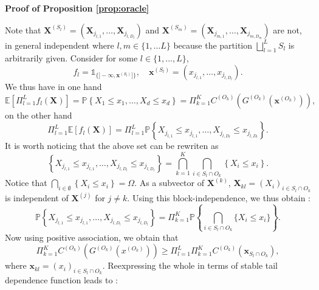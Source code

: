 \documentclass[11pt]{article}
\makeatletter
\theoremstyle{definition}
\renewenvironment{proof}[1][\proofname]{\par
\pushQED{\qed}%
\normalfont \topsep6\p@\@plus6\p@\relax
\trivlist
\item\relax
{\textbf{
#1\@addpunct{ }}}\hspace\labelsep\ignorespaces
}{%
\popQED\endtrivlist\@endpefalse
}
\makeatother
\begin{document}
	\begin{proof}[Proof of Proposition \ref{prop:oracle}]
		Note that $\textbf{X}^{(S_l)} = (\textbf{X}_{j_{l,1}}, \dots, \textbf{X}_{j_{l,D_l}})$ and $\textbf{X}^{(S_m)} = (\textbf{X}_{j_{m,1}}, \dots, \textbf{X}_{j_{m,D_m}})$ are not, in general independent where $l,m \in \{1,\dots L\}$ because the partition $\bigsqcup_{l=1}^L S_l$ is arbitrarily given. Consider for some $l \in \{1,\dots, L\}$,
		\begin{equation*}
			f_l = \mathds{1}_{\{]-\infty, \textbf{x}^{(S_l)}]\}}, \quad \textbf{x}^{(S_l)} = (x_{j_{l,1}}, \dots, x_{j_{l,D_l}}).
		\end{equation*}
		We thus have in one hand
		\begin{equation*}
			\mathbb{E}\left[ \Pi_{l=1}^L f_l(\textbf{X})\right] = \mathbb{P} \left\{ X_1 \leq x_1, \dots, X_d \leq x_d\right\} = \Pi_{k=1}^K C^{(O_k)}\left( G^{(O_k)}(\textbf{x}^{(O_k)})\right),
		\end{equation*}
		on the other hand
		\begin{equation*}
			\Pi_{l=1}^L \mathbb{E}\left[ f_l(\textbf{X})\right] = \Pi_{l=1}^L \mathbb{P}\left\{ X_{j_{l,1}} \leq x_{j_{l,1}}, \dots, X_{j_{l,D_l}} \leq x_{j_{l,D_l}}\right\}.
		\end{equation*}
		It is worth noticing that the above set can be rewriten as 
		\begin{equation*}
			\left\{ X_{j_{l,1}} \leq x_{j_{l,1}}, \dots, X_{j_{l,D_l}} \leq x_{j_{l,D_l}} \right\} = \bigcap_{k=1}^K \bigcap_{i \in S_l \cap O_k} \left\{ X_i \leq x_i \right\}.
		\end{equation*}
		Notice that $\bigcap_{i \in \emptyset} \left\{ X_i \leq x_i \right\} = \Omega$. As a subvector of $\textbf{X}^{(k)}$, $\textbf{X}_{kl} = ( X_i )_{i \in S_l \cap O_k}$ is independent of $\textbf{X}^{(j)}$ for $j \neq k$. Using this block-independence, we thus obtain :
		\begin{equation*}
			\mathbb{P}\left\{ X_{j_{l,1}} \leq x_{j_{l,1}}, \dots, X_{j_{l,D_l}} \leq x_{j_{l,D_l}} \right\} = \Pi_{k=1}^K \mathbb{P}\left\{ \bigcap_{i \in S_l \cap O_k } \{X_i \leq x_i \} \right\}.
		\end{equation*}
		Now using positive association, we obtain that
		\begin{equation*}
			\Pi_{k=1}^K C^{(O_k)}\left( G^{(O_k)}(x^{(O_k)})\right) \geq \Pi_{l=1}^L \Pi_{k=1}^K C^{(O_k)}\left(\textbf{x}_{S_l \cap O_k} \right),
		\end{equation*}
		where $\textbf{x}_{kl} = (x_i)_{i \in S_l \cap O_k}$. Reexpressing the whole in terms of stable tail dependence function leads to :

\end{proof}
\end{document}
